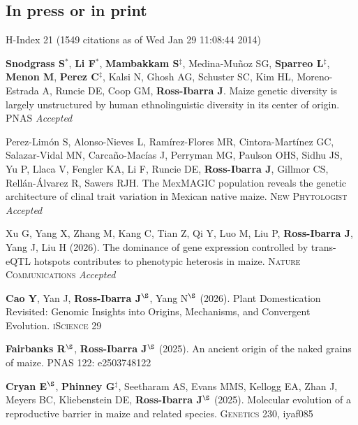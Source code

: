 \documentclass[letterpaper,10pt]{article}
\begin{document}
\subsection*{In press or in print} %
H-Index 21 {\small(1549 citations as of Wed Jan 29 11:08:44 2014)}
\begin{etaremune}
\setlength\itemsep{0ex}
\item \textbf{Snodgrass S}$^*$, \textbf{Li F}$^*$, \textbf{Mambakkam S}$^\ddagger$, Medina-Mu\~noz SG, \textbf{Sparreo L}$^\ddagger$, \textbf{Menon M}, \textbf{Perez C}$^\ddagger$, Kalsi N, Ghosh AG, Schuster SC, Kim HL, Moreno-Estrada A, Runcie DE, Coop GM, \textbf{Ross-Ibarra J}. Maize genetic diversity is largely unstructured by human ethnolinguistic diversity in its center of origin.  \textsc{PNAS} \textit{Accepted}  

\item Perez-Lim\'on S, Alonso-Nieves L, Ram\'irez-Flores MR, Cintora-Mart\'inez GC, Salazar-Vidal MN, Carca\~no-Mac\'ias J, Perryman MG, Paulson OHS, Sidhu JS, Yu P, Llaca V, Fengler KA, Li F, Runcie DE, \textbf{Ross-Ibarra J}, Gillmor CS, Rell\'an-\'Alvarez R, Sawers RJH. The MexMAGIC population reveals the genetic architecture of clinal trait variation in Mexican native maize. \textsc{New Phytologist} \textit{Accepted} %

\item Xu G, Yang X, Zhang M, Kang C, Tian Z, Qi Y, Luo M, Liu P, \textbf{Ross-Ibarra J}, Yang J, Liu H (2026). The dominance of gene expression controlled by trans-eQTL hotspots contributes to phenotypic heterosis in maize. \textsc{Nature Communications} \textit{Accepted} %

\item \textbf{Cao Y}, Yan J, \textbf{Ross-Ibarra J}$^\S$, Yang N$^\S$ (2026). Plant Domestication Revisited: Genomic Insights into Origins, Mechanisms, and Convergent Evolution. \textsc{iScience} 29 %

\item \textbf{Fairbanks R}$^\S$, \textbf{Ross-Ibarra J}$^\S$ (2025). An ancient origin of the naked grains of maize. \textsc{PNAS} 122: e2503748122 %

\item \textbf{Cryan E}$^\S$, \textbf{Phinney G}$^\ddagger$, Seetharam AS, Evans MMS, Kellogg EA, Zhan J, Meyers BC,  Kliebenstein DE, \textbf{Ross-Ibarra J}$^\S$ (2025). Molecular evolution of a reproductive barrier in maize and related species. \textsc{Genetics} 230, iyaf085 %


\end{etaremune}
\end{document}
